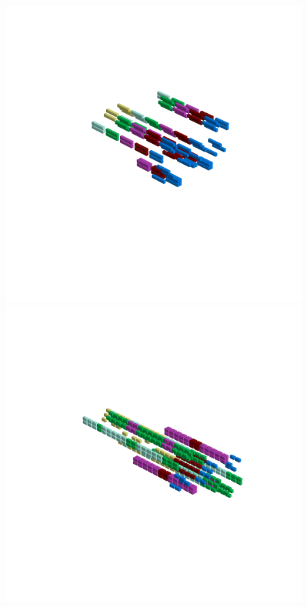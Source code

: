 \rhead[]{\leftmark}
\clearpage
\clearpage
\begin{figure}[H]
    \centering
      \vspace*{-3cm}
      \hspace*{-6cm}
      \includegraphics[width=15cm]{src/symmetries/pattern14_1-45.png}%
      \hspace*{-8cm}
      \includegraphics[width=15cm]{src/symmetries/pattern14_2-45.png}\\

\end{figure}
